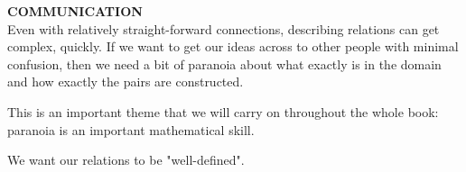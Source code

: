 \documentclass{ximera}
\begin{document}
\begin{remark} \textbf{COMMUNICATION} \\
Even with relatively straight-forward connections, describing relations can get complex, quickly.  If we want to get our ideas across to other people with minimal confusion, then we need a bit of paranoia about what exactly is in the domain and how exactly the pairs are constructed.

This is an important theme that we will carry on throughout the whole book: paranoia is an important mathematical skill.

We want our relations to be "well-defined".
\end{remark}

\quad \\
\end{document}

